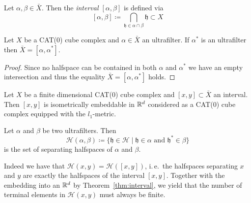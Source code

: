 \begin{defin}
  Let \(\alpha,\beta \in \bar X\). Then the \emph{interval \([\alpha,\beta]\)} is defined via
  \[
    [\alpha,\beta] \coloneqq \bigcap_{\mathfrak{h} \in \alpha \cap \beta} \mathfrak{h} \subset X
  \]
\end{defin}

\begin{lemma}
  \label{lem:x-interval}
  Let \(X\) be a CAT(0) cube complex and \(\alpha \in \bar X\) an ultrafilter. If \(\alpha^\ast\) is an ultrafilter then \(\bar X = [\alpha, \alpha^\ast]\).
\end{lemma}

\begin{proof}
  Since no halfspace can be contained in both \(\alpha\) and \(\alpha^\ast\) we have an empty intersection and thus the equality \(\bar X = [\alpha, \alpha^\ast]\) holds.
\end{proof}

\begin{thm}
  \label{thm:interval}
  Let \(X\) be a finite dimensional CAT(0) cube complex and \([x,y] \subset \bar X\) an interval. Then \([x,y]\) is isometrically embeddable in \(\mathbb{R}^d\) considered as a CAT(0) cube complex equipped with the \(l_1\)-metric.
\end{thm}

\begin{defin}
  \label{defin:separating}
  Let \(\alpha\) and \(\beta\) be two ultrafilters. Then
  \[
    \mathcal{H}(\alpha,\beta) \coloneqq \{\mathfrak{h} \in \mathcal{H} \mid \mathfrak{h} \in \alpha \text{ and } \mathfrak{h}^\ast \in \beta\}
  \]
  is the set of separating halfspaces of \(\alpha\) and \(\beta\).
\end{defin}

\begin{rem}
  \label{rem:interval}
  Indeed we have that \(\mathcal{H}(x,y) = \mathcal{H}([x,y])\), i.\,e.\ the halfspaces separating \(x\) and \(y\) are exactly the halfspaces of the interval \([x,y]\). Together with the embedding into an \(\mathbb{R}^d\) by Theorem~\ref{thm:interval}, we yield that the number of terminal elements in \(\mathcal{H}(x,y)\) must always be finite.
\end{rem}

